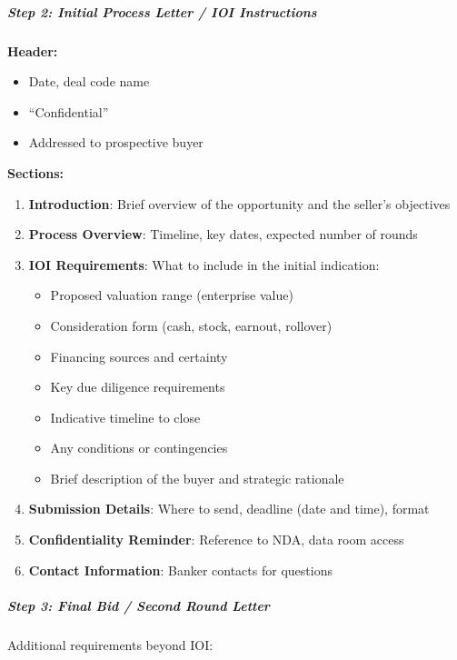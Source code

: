 \documentclass[11pt]{article}
\begin{document}
\subparagraph{Step 2: Initial Process Letter / IOI Instructions}\mbox{}\par

\textbf{Header:}

\begin{itemize}[leftmargin=*,itemsep=2pt,topsep=2pt]
\item {} Date, deal code name
\item {} ``Confidential''
\item {} Addressed to prospective buyer
\end{itemize}

\textbf{Sections:}


\begin{enumerate}[leftmargin=*,itemsep=2pt,topsep=2pt]
\item {} \textbf{Introduction}: Brief overview of the opportunity and the seller's objectives
\item {} \textbf{Process Overview}: Timeline, key dates, expected number of rounds
\item {} \textbf{IOI Requirements}: What to include in the initial indication:
\begin{itemize}[leftmargin=*,itemsep=2pt,topsep=2pt]
\item {} Proposed valuation range (enterprise value)
\item {} Consideration form (cash, stock, earnout, rollover)
\item {} Financing sources and certainty
\item {} Key due diligence requirements
\item {} Indicative timeline to close
\item {} Any conditions or contingencies
\item {} Brief description of the buyer and strategic rationale
\end{itemize}
\item {} \textbf{Submission Details}: Where to send, deadline (date and time), format
\item {} \textbf{Confidentiality Reminder}: Reference to NDA, data room access
\item {} \textbf{Contact Information}: Banker contacts for questions
\end{enumerate}

\subparagraph{Step 3: Final Bid / Second Round Letter}\mbox{}\par

Additional requirements beyond IOI:
\end{document}
